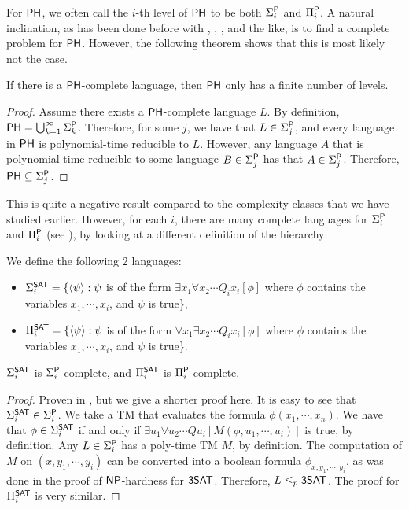 For $\PH$, we often call the $i$-th level of $\PH$ to be both $\Sigma_i^\P$ and $\Pi_i^\P$. A natural inclination, as has been done before with \NP, \PSPACE, \NL, and the like, is to find a complete problem for $\PH$. However, the following theorem shows that this is most likely not the case.

\begin{theorem}
If there is a $\PH$-complete language, then $\PH$ only has a finite number of levels.
\end{theorem}

\begin{proof}
Assume there exists a $\PH$-complete language $L$. By definition, $\PH = \bigcup_{k = 1}^{\infty} \Sigma_k^\P$. Therefore, for some $j$, we have that $L \in \Sigma_j^\P$, and every language in $\PH$ is polynomial-time reducible to $L$. However, any language $A$ that is polynomial-time reducible to some language $B \in \Sigma_j^\P$ has that $A \in \Sigma_j^\P$. Therefore, $\PH \subseteq \Sigma_j^\P$.
\end{proof}

This is quite a negative result compared to the complexity classes that we have studied earlier. However, for each $i$, there are many complete languages for $\Sigma_i^\P$ and $\Pi_i^\P$ (see \cite{Schaefer_completenessin}), by looking at a different definition of the hierarchy:
\begin{definition}
We define the following 2 languages:
\begin{itemize}
\item $\Sigma_i^{\SAT} = \{\langle \psi \rangle : \psi$ is of the form $\exists x_1 \forall x_2 \cdots Q_ix_i [\phi]$ where $\phi$ contains the variables $x_1,\cdots,x_i$, and $\psi$ is true\},
\item $\Pi_i^{\SAT} = \{\langle \psi \rangle : \psi$ is of the form $\forall x_1 \exists x_2 \cdots Q_ix_i [\phi]$ where $\phi$ contains the variables $x_1,\cdots,x_i$, and $\psi$ is true\}. 
\end{itemize}
\end{definition}

\begin{theorem}
$\Sigma_i^{\SAT}$ is $\Sigma_i^\P$-complete, and $\Pi_i^{\SAT}$ is $\Pi_i^\P$-complete.
\end{theorem}

\begin{proof}
Proven in \cite{Wrathall197623}, but we give a shorter proof here. It is easy to see that $\Sigma_i^{\SAT} \in \Sigma_i^\P$. We take a TM that evaluates the formula $\phi(x_1, \cdots, x_n)$. We have that $\phi \in \Sigma_i^{\SAT}$ if and only if $\exists u_1 \forall u_2 \cdots Qu_i [M(\phi, u_1, \cdots, u_i)]$ is true, by definition. Any $L \in \Sigma_i^\P$ has a poly-time TM $M$, by definition. The computation of $M$ on $(x, y_1, \cdots, y_i)$ can be converted into a boolean formula $\phi_{x, y_1, \cdots, y_i}$, as was done in the proof of $\NP$-hardness for $\ThreeSAT$. Therefore, $L \le_p \ThreeSAT$. The proof for $\Pi_i^{\SAT}$ is very similar.
\end{proof}

